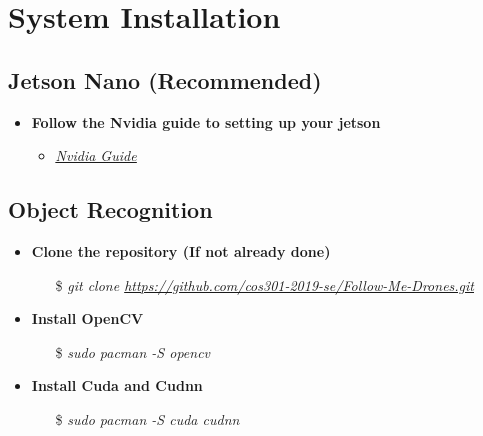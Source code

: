 \chapter{System Installation}

\section{Jetson Nano (Recommended)}
\begin{itemize}
    \item \textbf{Follow the Nvidia guide to setting up your jetson}
        \begin{itemize}
            \item \href{https://developer.nvidia.com/embedded/learn/get-started-jetson-nano-devkit}{\textit{\underline{Nvidia Guide}}}
        \end{itemize}
\end{itemize}

\section{Object Recognition}
\begin{itemize}
    \item \textbf{Clone the repository (If not already done)}
        \begin{itemize}
            \item[\$] \textit{git clone \url{https://github.com/cos301-2019-se/Follow-Me-Drones.git}}
        \end{itemize}
    \item \textbf{Install OpenCV}
        \begin{itemize}
            \item[\$] \textit{sudo pacman -S opencv}
        \end{itemize}
    \item \textbf{Install Cuda and Cudnn}
        \begin{itemize}
            \item[\$] \textit{sudo pacman -S cuda cudnn}
        \end{itemize}
\end{itemize}

